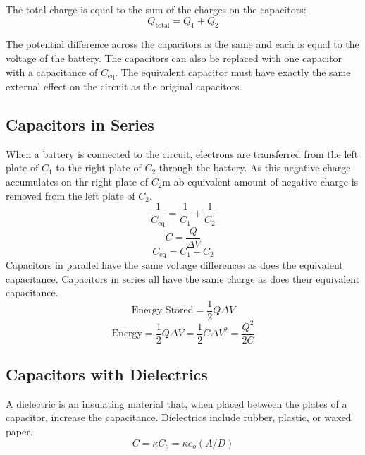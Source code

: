 The total charge is equal to the sum of the charges on the capacitors:
\[Q_{\text{total}}=Q_1+Q_2\]

The potential difference across the capacitors is the same and each is equal to the voltage of the battery. The capacitors can also be replaced with one capacitor with a capacitance of $C_{\text{eq}}$. The equivalent capacitor must have exactly the same external effect on the circuit as the original capacitors.

\subsection{Capacitors in Series}
When a battery is connected to the circuit, electrons are transferred from the left plate of $C_1$ to the right plate of $C_2$ through the battery. As this negative charge accumulates on thr right plate of $C_2$m ab equivalent amount of negative charge is removed from the left plate of $C_2$.
\[\frac{1}{C_{\text{eq}}}=\frac{1}{C_1}+\frac{1}{C_2}\]
\[C=\frac{Q}{\Delta V}\]
\[C_{\text{eq}}=C_1+C_2\]
Capacitors in parallel have the same voltage differences as does the equivalent capacitance. Capacitors in series all have the same charge as does their equivalent capacitance.
\[\text{Energy Stored} = \frac{1}{2}Q\Delta V\]
\[\text{Energy} = \frac{1}{2}Q\Delta V=\frac{1}{2}C\Delta V^2=\frac{Q^2}{2C}\]

\subsection{Capacitors with Dielectrics}
A dielectric is an insulating material that, when placed between the plates of a capacitor, increase the capacitance. Dielectrics include rubber, plastic, or waxed paper.
\[C=\kappa C_o=\kappa e_o(A/D)\]










